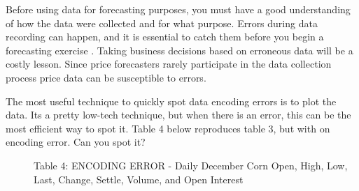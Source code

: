 \documentclass[]{book}
\theoremstyle{definition}
\theoremstyle{definition}
\theoremstyle{remark}
\begin{document}
Before using data for forecasting purposes, you must have a good
understanding of how the data were collected and for what purpose.
Errors during data recording can happen, and it is essential to catch
them before you begin a forecasting exercise . Taking business decisions
based on erroneous data will be a costly lesson. Since price forecasters
rarely participate in the data collection process price data can be
susceptible to errors.

\begin{description}
\item[The most useful technique to quickly spot data encoding errors is
to plot the data. Its a pretty low-tech technique, but when there is an
error, this can be the most efficient way to spot it. Table 4 below
reproduces table 3, but with on encoding error. Can you spot it?]
Table 4: ENCODING ERROR - Daily December Corn Open, High, Low, Last,
Change, Settle, Volume, and Open Interest
\end{description}
\end{document}
